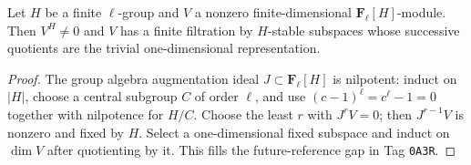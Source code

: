 
\begin{lemma}
\label{lemma:weil-pbc-finite-l-group-filtration}
\uses{}
Let $H$ be a finite $\ell$-group and $V$ a nonzero finite-dimensional
$\mathbf F_\ell[H]$-module.  Then $V^H\ne0$ and $V$ has a finite filtration
by $H$-stable subspaces whose successive quotients are the trivial
one-dimensional representation.
\end{lemma}
\begin{proof}
\uses{} 
The group algebra augmentation ideal $J\subset\mathbf F_\ell[H]$ is nilpotent:
induct on $|H|$, choose a central subgroup $C$ of order $\ell$, and use
$(c-1)^\ell=c^\ell-1=0$ together with nilpotence for $H/C$.  Choose the least
$r$ with $J^rV=0$; then $J^{r-1}V$ is nonzero and fixed by $H$.  Select a
one-dimensional fixed subspace and induct on $\dim V$ after quotienting by it.
This fills the future-reference gap in Tag \texttt{0A3R}.
\end{proof}

